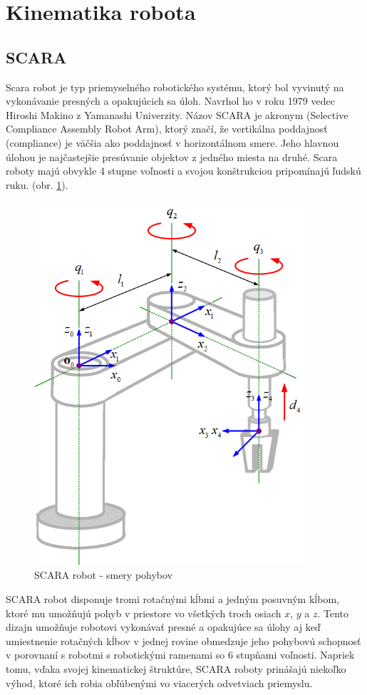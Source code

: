 
\section{Kinematika robota}
\label{kap:1}

\subsection{SCARA}
\label{kap:1.1}

Scara robot je typ priemyselného robotického systému, ktorý bol vyvinutý na vykonávanie presných a opakujúcich sa úloh. Navrhol ho v roku 1979 vedec Hiroshi Makino z Yamanashi Univerzity\cite{SCARA-uvod}. Názov SCARA je akronym (Selective Compliance Assembly Robot Arm), ktorý značí, že vertikálna poddajnosť (compliance) je väčšia ako poddajnosť v horizontálnom smere. Jeho hlavnou úlohou je najčastejšie presúvanie objektov z jedného miesta na druhé. Scara roboty majú obvykle 4 stupne voľnosti a svojou konštrukciou pripomínajú ľudskú ruku. (obr. \ref{OBRAZOK 1.1}).
\begin{figure}[h]
	\centering
	\includegraphics[width=100mm]{img/SCARA-robot-manipulator.png}
	\caption{SCARA robot - smery pohybov\cite{SCARA-struktura}}\label{OBRAZOK 1.1} 
\end{figure} 

SCARA robot disponuje tromi rotačnými kĺbmi a jedným posuvným kĺbom, ktoré mu umožňujú pohyb v priestore vo všetkých troch osiach $x$, $y$ a $z$. Tento dizajn umožňuje robotovi vykonávať presné a opakujúce sa úlohy aj keď umiestnenie rotačných kĺbov v jednej rovine obmedzuje jeho pohybovú schopnosť v porovnaní s robotmi  s robotickými ramenami so 6 stupňami voľnosti. Napriek tomu, vďaka svojej kinematickej štruktúre, SCARA roboty prinášajú niekoľko výhod, ktoré ich robia obľúbenými vo viacerých odvetviach priemyslu.

